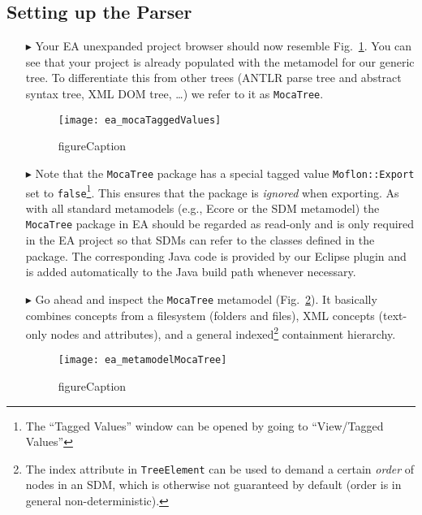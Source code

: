\newpage
\hypertarget{M2TSettingUp vis}{}
\subsection{Setting up the Parser}
\visHeader

\begin{enumerate}

\item[$\blacktriangleright$] Your EA unexpanded project browser should now resemble Fig.~\ref{ea:mocaTagged}. You can see that your project is already populated
with the metamodel for our generic tree. To differentiate this from other trees (ANTLR parse tree and abstract syntax tree, XML DOM tree, \ldots) we refer to it
as \texttt{MocaTree}.

\begin{figure}[htpb]
\begin{center}
  \texttt{[image: ea\_mocaTaggedValues]}
  \caption{figureCaption}
  \label{ea:mocaTagged}
\end{center}
\end{figure}

\item[$\blacktriangleright$] Note that the \texttt{MocaTree} package has a special tagged value \texttt{Moflon::Export} set to \texttt{false}\footnote{The
``Tagged Values'' window can be opened by going to ``View/Tagged Values''}. This ensures that the package is \emph{ignored} when exporting. As with all standard
metamodels (e.g., Ecore or the SDM metamodel) the \texttt{MocaTree} package in EA should be regarded as read-only and is only required in the EA project so that
SDMs can refer to the classes defined in the package. The corresponding Java code is provided by our Eclipse plugin and is added automatically to the Java build
path whenever necessary.

\item[$\blacktriangleright$] Go ahead and inspect the \texttt{MocaTree} metamodel (Fig.~\ref{ea:mocaTree}). It basically combines concepts from a filesystem
(folders and files), XML concepts (text-only nodes and attributes), and a general indexed\footnote{The index attribute in \texttt{TreeElement} can be used to
demand a certain \emph{order} of nodes in an SDM, which is otherwise not guaranteed by default (order is in general non-deterministic).} containment hierarchy.

\begin{figure}[htpb]
\begin{center}
  \texttt{[image: ea\_metamodelMocaTree]}
  \caption{figureCaption}
  \label{ea:mocaTree}
\end{center}
\end{figure}
 

\end{enumerate}
